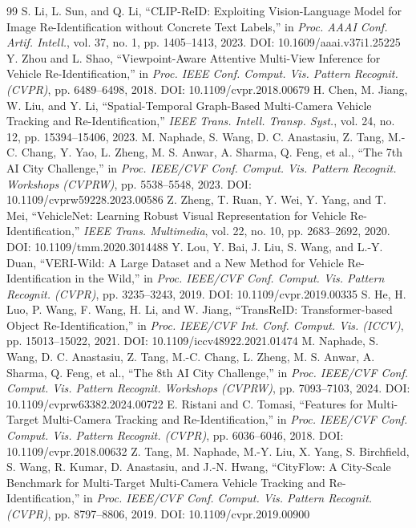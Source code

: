 \documentclass{ijitcs}
\newcommand{\crx}[1]{{\color{red}#1}}
\begin{document}
\begin{thebibliography}{99}
 S. Li, L. Sun, and Q. Li, ``CLIP-ReID: Exploiting Vision-Language Model for Image Re-Identification \crx{without Concrete Text Labels},'' in \emph{Proc. AAAI Conf. Artif. Intell.}, vol. 37, no. 1, pp. 1405--1413, 2023. \crx{DOI: 10.1609/aaai.v37i1.25225}
 Y. Zhou and L. Shao, ``Viewpoint-Aware Attentive Multi-View Inference for Vehicle Re-Identification,'' in \emph{Proc. IEEE Conf. Comput. Vis. Pattern Recognit. (CVPR)}, pp. 6489--6498, 2018. \crx{DOI: 10.1109/cvpr.2018.00679}
 H. Chen, M. Jiang, W. Liu, and Y. Li, ``Spatial-Temporal Graph-Based Multi-Camera Vehicle Tracking and Re-Identification,'' \emph{IEEE Trans. Intell. Transp. Syst.}, vol. 24, no. 12, pp. 15394--15406, 2023.
 M. Naphade, S. Wang, D. C. Anastasiu, Z. Tang, M.-C. Chang, Y. Yao, L. Zheng, M. S. Anwar, A. Sharma, Q. Feng, et al., ``The 7th AI City Challenge,'' in \emph{Proc. IEEE/CVF Conf. Comput. Vis. Pattern Recognit. Workshops (CVPRW)}, pp. 5538--5548, 2023. \crx{DOI: 10.1109/cvprw59228.2023.00586}
 Z. Zheng, T. Ruan, Y. Wei, Y. Yang, and T. Mei, ``VehicleNet: Learning Robust Visual Representation for Vehicle Re-Identification,'' \emph{IEEE Trans. Multimedia}, vol. 22, no. 10, pp. 2683--2692, 2020. \crx{DOI: 10.1109/tmm.2020.3014488}
 Y. Lou, Y. Bai, J. Liu, S. Wang, and L.-Y. Duan, ``VERI-Wild: A Large Dataset and a New Method for Vehicle Re-Identification in the Wild,'' in \emph{Proc. IEEE/CVF Conf. Comput. Vis. Pattern Recognit. (CVPR)}, pp. 3235--3243, 2019. \crx{DOI: 10.1109/cvpr.2019.00335}
 S. He, H. Luo, P. Wang, F. Wang, H. Li, and W. Jiang, ``TransReID: Transformer-based Object Re-Identification,'' in \emph{Proc. IEEE/CVF Int. Conf. Comput. Vis. (ICCV)}, pp. 15013--15022, 2021. \crx{DOI: 10.1109/iccv48922.2021.01474}
 M. Naphade, S. Wang, D. C. Anastasiu, Z. Tang, M.-C. Chang, L. Zheng, M. S. Anwar, A. Sharma, Q. Feng, et al., ``The 8th AI City Challenge,'' in \emph{Proc. IEEE/CVF Conf. Comput. Vis. Pattern Recognit. Workshops (CVPRW)}, pp. 7093--7103, 2024. \crx{DOI: 10.1109/cvprw63382.2024.00722}
 E. Ristani and C. Tomasi, ``Features for Multi-Target Multi-Camera Tracking and Re-Identification,'' in \emph{Proc. IEEE/CVF Conf. Comput. Vis. Pattern Recognit. (CVPR)}, pp. 6036--6046, 2018. \crx{DOI: 10.1109/cvpr.2018.00632}
 Z. Tang, M. Naphade, M.-Y. Liu, X. Yang, S. Birchfield, S. Wang, R. Kumar, D. Anastasiu, and J.-N. Hwang, ``CityFlow: A City-Scale Benchmark for Multi-Target Multi-Camera Vehicle Tracking and Re-Identification,'' in \emph{Proc. IEEE/CVF Conf. Comput. Vis. Pattern Recognit. (CVPR)}, pp. 8797--8806, 2019. \crx{DOI: 10.1109/cvpr.2019.00900}

\end{thebibliography}
\end{document}
